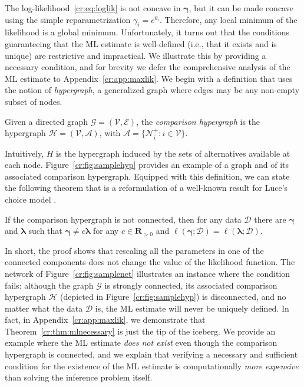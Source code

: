 The log-likelihood~\eqref{cr:eq:loglik} is not concave in $\bm{\gamma}$, but it can be made concave using the simple reparametrization $\gamma_i = e^{\theta_i}$.
Therefore, any local minimum of the likelihood is a global minimum.
Unfortunately, it turns out that the conditions guaranteeing that the ML estimate is well-defined (i.e., that it exists and is unique) are restrictive and impractical.
We illustrate this by providing a necessary condition, and for brevity we defer the comprehensive analysis of the ML estimate to Appendix~\ref{cr:app:maxlik}.
We begin with a definition that uses the notion of \emph{hypergraph}, a generalized graph where edges may be any non-empty subset of nodes.
\begin{definition}
Given a directed graph $\mathcal{G} = (\mathcal{V}, \mathcal{E})$, the \emph{comparison hypergraph} is the hypergraph $\mathcal{H} = (\mathcal{V}, \mathcal{A})$, with $\mathcal{A} = \{ \mathcal{N}^+_i : i \in \mathcal{V} \}$.
\end{definition}
Intuitively, $H$ is the hypergraph induced by the sets of alternatives available at each node.
Figure~\ref{cr:fig:samplehyp} provides an example of a graph and of its associated comparison hypergraph.
Equipped with this definition, we can state the following theorem that is a reformulation of a well-known result for Luce's choice model \citep{hunter2004mm}.
\begin{theorem}
\label{cr:thm:mlnecessary}
If the comparison hypergraph is not connected, then for any data $\mathcal{D}$ there are $\bm{\gamma}$ and $\bm{\lambda}$ such that $\bm{\gamma} \neq c \bm{\lambda}$ for any $c \in \mathbf{R}_{>0}$ and $\ell(\bm{\gamma} ; \mathcal{D}) = \ell(\bm{\lambda} ; \mathcal{D}).$
\end{theorem}
In short, the proof shows that rescaling all the parameters in one of the connected components does not change the value of the likelihood function.
The network of Figure~\ref{cr:fig:samplenet} illustrates an instance where the condition fails:
although the graph $\mathcal{G}$ is strongly connected, its associated comparison hypergraph $\mathcal{H}$ (depicted in Figure~\ref{cr:fig:samplehyp}) is disconnected, and no matter what the data $\mathcal{D}$ is, the ML estimate will never be uniquely defined.
In fact, in Appendix~\ref{cr:app:maxlik}, we demonstrate that Theorem~\ref{cr:thm:mlnecessary} is just the tip of the iceberg.
We provide an example where the ML estimate \emph{does not exist} even though the comparison hypergraph is connected, and we explain that verifying a necessary and sufficient condition for the existence of the ML estimate is computationally \emph{more expensive} than solving the inference problem itself.

